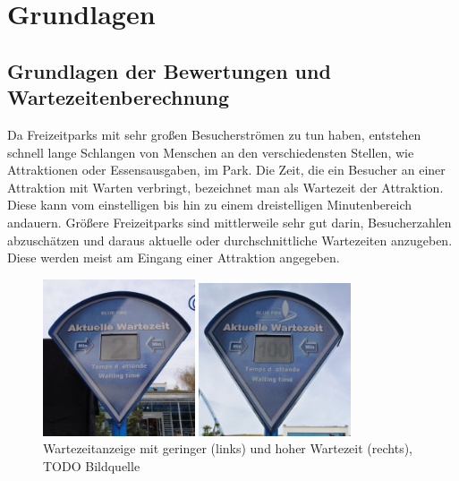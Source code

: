 \chapter{Grundlagen}
\label{cha:grundlagen}

\section{Grundlagen der Bewertungen und Wartezeitenberechnung}
\label{sec:grundlagen:bewertugnen}

Da Freizeitparks mit sehr großen Besucherströmen zu tun haben, entstehen schnell lange Schlangen von Menschen an den verschiedensten Stellen, wie Attraktionen oder Essensausgaben, im Park. Die Zeit, die ein Besucher an einer Attraktion mit Warten verbringt, bezeichnet man als Wartezeit der Attraktion. Diese kann vom einstelligen bis hin zu einem dreistelligen Minutenbereich andauern. Größere Freizeitparks sind mittlerweile sehr gut darin, Besucherzahlen abzuschätzen und daraus aktuelle oder durchschnittliche Wartezeiten anzugeben. Diese werden meist am Eingang einer Attraktion angegeben.

\begin{figure}[h]
    \centering
    \begin{minipage}{0.49\textwidth}
        \centering
        \includegraphics[width=0.4\textwidth]{img/motivation/wartezeit_2.jpg}
    \end{minipage}
    \begin{minipage}{0.49\textwidth}
        \centering
        \includegraphics[width=0.4\textwidth]{img/motivation/wartezeit_100.jpg}
    \end{minipage}
\caption[Wartezeitanzeige im Park]{Wartezeitanzeige mit geringer (links) und hoher Wartezeit (rechts), TODO Bildquelle}
		\label{figure:grundlagenwaittime}
\end{figure}

